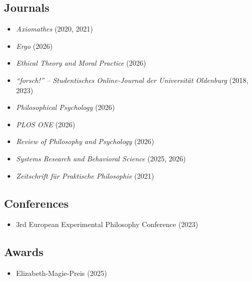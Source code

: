 \documentclass[a4paper,10pt]{article}
\begin{document}
\subsection*{Journals}
\begin{itemize}
   \item \textit{Axiomathes} (2020, 2021)
   \item \textit{Ergo} (2026)
   \item \textit{Ethical Theory and Moral Practice} (2026)
   \item \textit{\enquote{forsch!} -- Studentisches Online-Journal der Universität Oldenburg} (2018, 2023)
   \item \textit{Philosophical Psychology} (2026)
   \item \textit{PLOS ONE} (2026)
   \item \textit{Review of Philosophy and Psychology} (2026)
   \item \textit{Systems Research and Behavioral Science} (2025, 2026)
   \item \textit{Zeitschrift für Praktische Philosophie} (2021)
\end{itemize}


\subsection*{Conferences}
\begin{itemize}
   \item 3rd European Experimental Philosophy Conference (2023)
\end{itemize}


\subsection*{Awards}
\begin{itemize}
   \item Elizabeth-Magie-Preis (2025)
\end{itemize}


\clearpage
\end{document}
